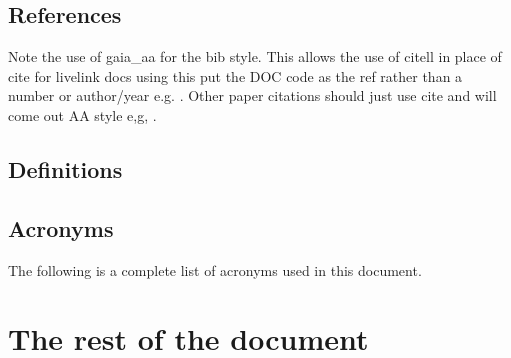 \documentclass[DM,TN]{lsstdoc}
\begin{document}
\subsection{References\label{sect:refs}} \vspace*{-1cm}
\renewcommand{\refname}{}



Note the use of gaia\_aa for the bib style. This allows the use of citell in
place of cite for livelink docs using this put the DOC code as the ref
rather than a number or author/year e.g. . Other paper
citations should just use cite and will come out AA style e,g, \cite{2001ASPC..225..201O}.

\subsection{Definitions \label{sect:definition}}

\subsection{Acronyms \label{sect:acronyms}}
The following is a complete list of acronyms used in this document.



\section{The rest of the document \label{sect:sec1}}


\end{document}
